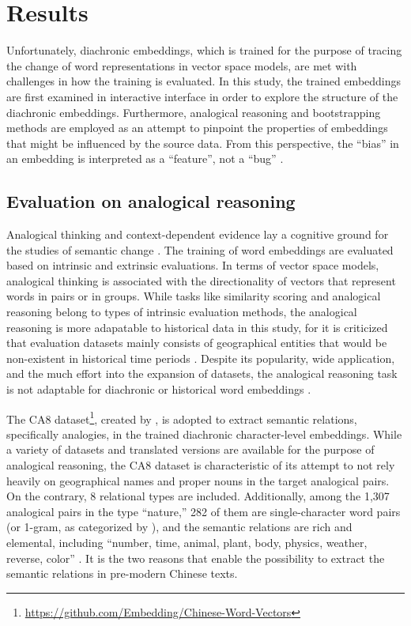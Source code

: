 

\chapter{Results}

Unfortunately, diachronic embeddings, which is trained for the purpose of tracing the change of word representations in vector space models, are met with challenges in how the training is evaluated. In this study, the trained embeddings are first examined in interactive interface in order to explore the structure of the diachronic embeddings. Furthermore, analogical reasoning and bootstrapping methods are employed as an attempt to pinpoint the properties of embeddings that might be influenced by the source data. From this perspective, the ``bias'' in an embedding is interpreted as a ``feature'', not a ``bug'' \parencite{wevers2020digital}.

\section{Evaluation on analogical reasoning}

Analogical thinking and context-dependent evidence lay a cognitive ground for the studies of semantic change \parencite{traugott2017semantic}. The training of word embeddings are evaluated based on intrinsic and extrinsic evaluations. In terms of vector space models, analogical thinking is associated with the directionality of vectors that represent words in pairs or in groups. While tasks like similarity scoring and analogical reasoning belong to types of intrinsic evaluation methods, the analogical reasoning is more adapatable to historical data in this study, for it is criticized that evaluation datasets mainly consists of geographical entities that would be non-existent in historical time periods \parencite{wevers2020digital,li2018analogical}. Despite its popularity, wide application, and the much effort into the expansion of datasets, the analogical reasoning task is not adaptable for diachronic or historical word embeddings \parencite{wevers2020digital}.

The CA8 dataset\footnote{\url{https://github.com/Embedding/Chinese-Word-Vectors}}, created by \textcite{li2018analogical}, is adopted to extract semantic relations, specifically analogies, in the trained diachronic character-level embeddings. While a variety of datasets and translated versions are available for the purpose of analogical reasoning, the CA8 dataset is characteristic of its attempt to not rely heavily on geographical names and proper nouns in the target analogical pairs. On the contrary, 8 relational types are included. Additionally, among the 1,307 analogical pairs in the type ``nature,'' 282 of them are single-character word pairs (or 1-gram, as categorized by \textcite{li2018analogical}), and the semantic relations are rich and elemental, including ``number, time, animal, plant, body, physics, weather, reverse, color'' \parencite{li2018analogical}. It is the two reasons that enable the possibility to extract the semantic relations in pre-modern Chinese texts.

